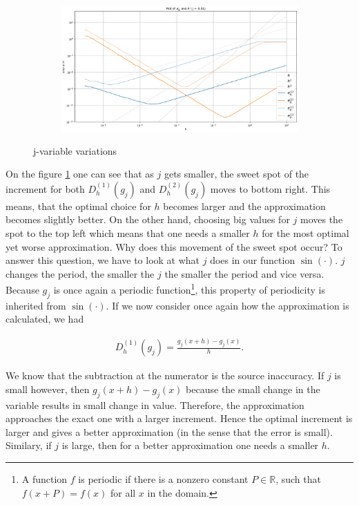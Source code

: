 \begin{figure}[h!]
\begin{subfigure}[b]{0.49\linewidth}
    \end{subfigure}
    \begin{subfigure}[b]{0.49\linewidth}
        \includegraphics[width=\linewidth]{graphics/j_error_plot/tiny_j.png}
    \end{subfigure}
    \caption{j-variable variations}
    \label{fig:exp2_j}
\end{figure}

On the figure \ref{fig:exp2_j} one can see that as \(j\) gets smaller, the sweet spot of the increment for both \(D^{(1)}_h(g_j)\) and \(D^{(2)}_h(g_j)\) moves to bottom right. This means, that the optimal choice for \(h\) becomes larger and the approximation becomes slightly better. On the other hand, choosing big values for \(j\) moves the spot to the top left which means that one needs a smaller \(h\) for the most optimal yet worse approximation.
Why does this movement of the sweet spot occur? To answer this question, we have to look at what \(j\) does in our function \(\sin(\cdot)\). \(j\) changes the period, the smaller the \(j\) the smaller the period and vice versa. Because \(g_j\) is once again a periodic function\footnote{A function \(f\) is periodic if there is a nonzero constant \(P \in \mathbb{R}\), such that \(f(x + P) = f(x)\) for all \(x\) in the domain.}, this property of periodicity is inherited from \(\sin(\cdot)\). If we now consider once again how the approximation is calculated, we had

\begin{align*}
    D^{(1)}_h (g_j) = \frac{g_j(x + h) - g_j(x)}{h} \text{.}
\end{align*}

We know that the subtraction at the numerator is the source inaccuracy. If \(j\) is small however, then \(g_j(x + h) - g_j(x)\) because the small change in the variable results in small change in value. Therefore, the approximation approaches the exact one with a larger increment. Hence the optimal increment is larger and gives a better approximation (in the sense that the error is small). Similary, if \(j\) is large, then for a better approximation one needs a smaller \(h\).